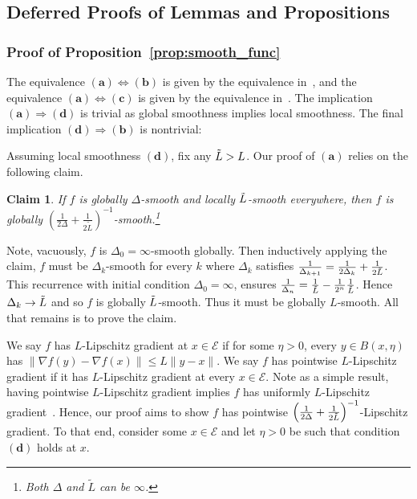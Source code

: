 \documentclass[sn-mathphys,Numbered]{sn-jnl}%
\newtheorem{claim}[theorem]{Claim}%
\begin{document}
\begin{appendices}
{\subsection{Deferred Proofs of Lemmas and Propositions}

\subsubsection{Proof of Proposition~\ref{prop:smooth_func}} \label{proof:smooth_func}
The equivalence $\mathbf{(a)\Leftrightarrow(b)}$ is given by the equivalence in~\cite[Theorem 2.1.5 $\mathbf{(2.1.9)\Leftrightarrow (2.1.11)}$]{nesterov2018lectures}, and the equivalence $\mathbf{(a)\Leftrightarrow(c)}$ is given by the equivalence in~\cite[Proposition 12.60 $\mathbf{(e)\Leftrightarrow(d)}$]{rockafellar2009variational}.  The implication $\mathbf{(a) \Rightarrow (d)}$ is trivial as global smoothness implies local smoothness. The final implication $\mathbf{(d) \Rightarrow (b)}$ is nontrivial:

Assuming local smoothness $\mathbf{(d)}$, fix any $\Tilde{L}>L$. Our proof of $\mathbf{(a)}$ relies on the following claim.
\begin{claim} \label{claim:point_lip}
    If $f$ is globally $\Delta$-smooth and locally $\Tilde{L}$-smooth everywhere, then $f$ is globally $\left(\frac{1}{2\Delta}+\frac{1}{2\tilde{L}}\right)^{-1}$-smooth.\footnote{Both $\Delta$ and $\tilde {L}$ can be $\infty$.}
\end{claim}
Note, vacuously, $f$ is $\Delta_0=\infty$-smooth globally. Then inductively applying the claim, $f$ must be $\Delta_k$-smooth for every $k$ where $\Delta_k$ satisfies $\frac{1}{\Delta_{k+1}}=\frac{1}{2\Delta_k}+\frac{1}{2\Tilde{L}}$. This recurrence with initial condition $\Delta_0=\infty$, ensures $\frac{1}{\Delta_{n}}=\frac{1}{\Tilde{L}}-\frac{1}{2^{n}}\frac{1}{\Tilde{L}}$.
Hence $\Delta_k \rightarrow \Tilde{L}$ and so $f$ is globally $\Tilde{L}$-smooth. Thus it must be globally $L$-smooth. All that remains is to prove the claim.

We say $f$ has $L$-Lipschitz gradient at $x\in\mathcal{E}$ if for some $\eta>0$, every $y\in B(x,\eta)$ has $\|\nabla f(y)-\nabla f(x)\| \leq L\|y-x\|$. We say $f$ has pointwise $L$-Lipschitz gradient if it has $L$-Lipschitz gradient at every $x\in\mathcal{E}$. Note as a simple result, having pointwise $L$-Lipschitz gradient implies $f$ has uniformly $L$-Lipschitz gradient~\cite[Corollary 2.4]{durand2010pointwise}. Hence, our proof aims to show $f$ has pointwise $\left(\frac{1}{2\Delta}+\frac{1}{2\Tilde{L}}\right)^{-1}$-Lipschitz gradient. To that end, consider some $x\in\mathcal{E}$ and let $\eta>0$ be such that condition $\mathbf{(d)}$ holds at $x$.

}
\end{appendices}
\end{document}
